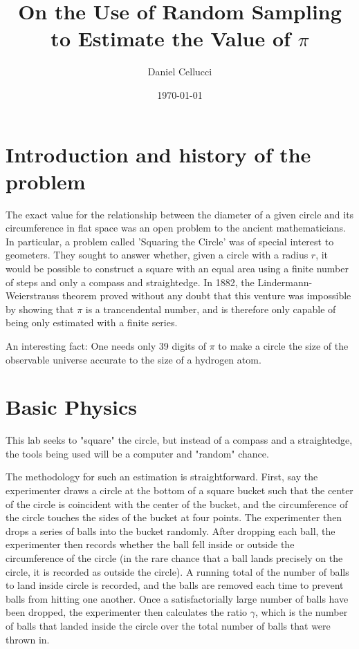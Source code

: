 \documentclass[twocolumn,prb,amsmath,amssymb,amsfonts]{revtex4}
\begin{document}
\title{On the Use of Random Sampling to Estimate the Value of $\pi$}

\author{Daniel Cellucci}

\date{\today}

\begin{abstract}

\end{abstract}

\maketitle
\section{Introduction and history of the problem}
The exact value for the relationship between the diameter of a given circle and its circumference in flat space was an open problem to the ancient mathematicians. In particular, a problem called 'Squaring the Circle' was of special interest to geometers. They sought to answer whether, given a circle with a radius $r$, it would be possible to construct a square with an equal area using a finite number of steps and only a compass and straightedge. In 1882, the Lindermann-Weierstrauss theorem proved without any doubt that this venture was impossible by showing that $\pi$ is a trancendental number, and is therefore only capable of being only estimated with a finite series.
 
An interesting fact: One needs only 39 digits of $\pi$ to make a circle the size of the observable universe accurate to the size of a hydrogen atom.

\section{Basic Physics}
This lab seeks to "square" the circle, but instead of a compass and a straightedge, the tools being used will be a computer and "random" chance. 

The methodology for such an estimation is straightforward. First, say the experimenter draws a circle at the bottom of a square bucket such that the center of the circle is coincident with the center of the bucket, and the circumference of the circle touches the sides of the bucket at four points. The experimenter then drops a series of balls into the bucket randomly. After dropping each ball, the experimenter then records whether the ball fell inside or outside the circumference of the circle (in the rare chance that a ball lands precisely on the circle, it is recorded as outside the circle). A running total of the number of balls to land inside circle is recorded, and the balls are removed each time to prevent balls from hitting one another. Once a satisfactorially large number of balls have been dropped, the experimenter then calculates the ratio $\gamma$, which is the number of balls that landed inside the circle over the total number of balls that were thrown in.
\end{document}
